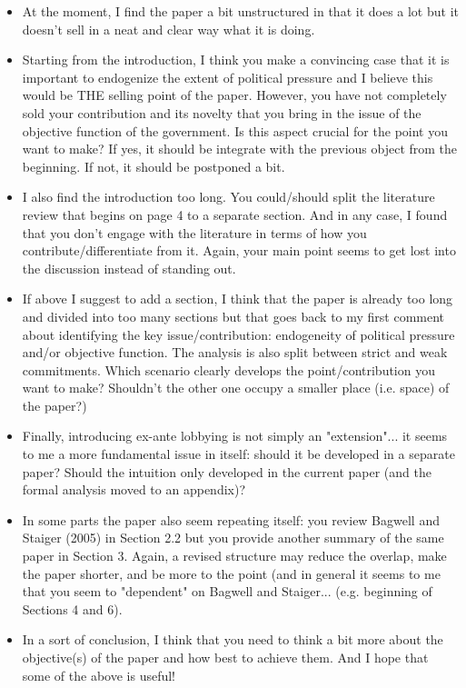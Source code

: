 \documentclass[12pt]{article}
\begin{document}
\begin{itemize}
	\item At the moment, I find the paper a bit unstructured in that it does a lot but it doesn't sell in a neat and clear way what it is doing.
	\item Starting from the introduction, I think you make a convincing case that it is important to endogenize the extent of political pressure and I believe this would be THE selling point of the paper. However, you have not completely sold your contribution and its novelty that you bring in the issue of the objective function of the government. Is this aspect crucial for the point you want to make? If yes, it should be integrate with the previous object from the beginning. If not, it should be postponed a bit.
	\item I also find the introduction too long. You could/should split the literature review that begins on page 4 to a separate section. And in any case, I found that you don't engage with the literature in terms of how you contribute/differentiate from it. Again, your main point seems to get lost into the discussion instead of standing out.
	\item If above I suggest to add a section, I think that the paper is already too long and divided into too many sections but that goes back to my first comment about identifying the key issue/contribution: endogeneity of political pressure and/or objective function. The analysis is also split between strict and weak commitments. Which scenario clearly develops the point/contribution you want to make? Shouldn't the other one occupy a smaller place (i.e. space) of the paper?)
	\item Finally, introducing ex-ante lobbying is not simply an "extension"... it seems to me a more fundamental issue in itself: should it be developed in a separate paper? Should the intuition only developed in the current paper (and the formal analysis moved to an appendix)?
	\item In some parts the paper also seem repeating itself: you review Bagwell and Staiger (2005) in Section 2.2 but you provide another summary of the same paper in Section 3. Again, a revised structure may reduce the overlap, make the paper shorter, and be more to the point (and in general it seems to me that you seem to "dependent" on Bagwell and Staiger... (e.g. beginning of Sections 4 and 6).
	\item In a sort of conclusion, I think that you need to think a bit more about the objective(s) of the paper and how best to achieve them. And I hope that some of the above is useful!
\end{itemize}
\end{document}
